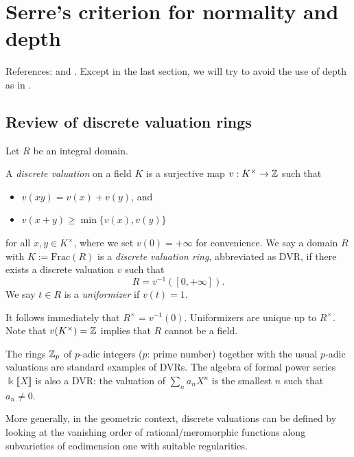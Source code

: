 
\chapter{Serre's criterion for normality and depth}

References: \cite[\S 11]{Eis95} and \cite[{X.1}]{Bour98}. Except in the last section, we will try to avoid the use of depth as in \cite{Eis95}.

\section{Review of discrete valuation rings}
Let $R$ be an integral domain.

\begin{definition}
	A \emph{discrete valuation} on a field $K$ is a surjective map $v: K^\times \to \mathbb{Z}$ such that
	\begin{itemize}
		\item $v(xy) = v(x) + v(y)$, and
		\item $v(x+y) \geq \min\{v(x), v(y) \}$
	\end{itemize}
	for all $x,y \in K^\times$, where we set $v(0) = +\infty$ for convenience. We say a domain $R$ with $K := \mathrm{Frac}(R)$ is a \emph{discrete valuation ring}, abbreviated as DVR, if there exists a discrete valuation $v$ such that
	\[ R = v^{-1}([0, +\infty]). \]
	We say $t \in R$ is a \emph{uniformizer} if $v(t)=1$.
\end{definition}
It follows immediately that $R^\times = v^{-1}(0)$. Uniformizers are unique up to $R^\times$. Note that $v(K^\times) = \mathbb{Z}$ implies that $R$ cannot be a field.

\begin{example}
	The rings $\mathbb{Z}_p$ of $p$-adic integers ($p$: prime number) together with the usual $p$-adic valuations are standard examples of DVRs. The algebra of formal power series $\Bbbk\llbracket X\rrbracket$ is also a DVR: the valuation of $\sum_n a_n X^n$ is the smallest $n$ such that $a_n \neq 0$.
	
	More generally, in the geometric context, discrete valuations can be defined by looking at the vanishing order of rational/meromorphic functions along subvarieties of codimension one with suitable regularities.
\end{example}

